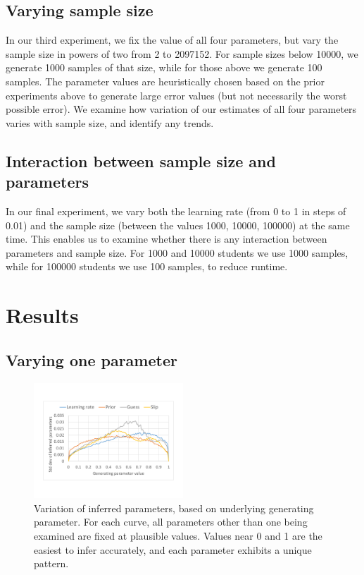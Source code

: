 \documentclass{edm_template}
\begin{document}
\subsection{Varying sample size}
\label{variance3method}

In our third experiment, we fix the value of all four parameters, but vary the sample size in powers of two from 2 to 2097152. For sample sizes below 10000, we generate 1000 samples of that size, while for those above we generate 100 samples. The parameter values are heuristically chosen based on the prior experiments above to generate large error values (but not necessarily the worst possible error). We examine how variation of our estimates of all four parameters varies with sample size, and identify any trends.

\subsection{Interaction between sample size and parameters}
\label{variance4method}

In our final experiment, we vary both the learning rate (from 0 to 1 in steps of 0.01) and the sample size (between the values 1000, 10000, 100000) at the same time. This enables us to examine whether there is any interaction between parameters and sample size. For 1000 and 10000 students we use 1000 samples, while for 100000 students we use 100 samples, to reduce runtime.

\section{Results}

\subsection{Varying one parameter}
\label{variance1}

\begin{figure}
\centering
\includegraphics[width=0.5\textwidth]{data/variance1.pdf}
\caption{Variation of inferred parameters, based on underlying generating parameter. For each curve, all parameters other than one being examined are fixed at plausible values. Values near 0 and 1 are the easiest to infer accurately, and each parameter exhibits a unique pattern.}
\label{fig:variance1}
\end{figure}
\end{document}
